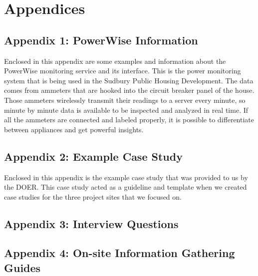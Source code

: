 \newpage
\chapter*{Appendices}

\section*{Appendix 1: PowerWise Information}
\par Enclosed in this appendix are some examples and information about the PowerWise monitoring service and its interface. This is the power monitoring system that is being used in the Sudbury Public Housing Development. The data comes from ammeters that are hooked into the circuit breaker panel of the house. Those ammeters wirelessly transmit their readings to a server every minute, so minute by minute data is available to be inspected and analyzed in real time. If all the ammeters are connected and labeled properly, it is possible to differentiate between appliances and get powerful insights.

\newpage
\addtocounter{page}{1}
\section*{Appendix 2: Example Case Study}
\par Enclosed in this appendix is the example case study that was provided to us by the DOER. This case study acted as a guideline and template when we created case studies for the three project sites that we focused on.

\newpage
\addtocounter{page}{2}
\section*{Appendix 3: Interview Questions}

\newpage
\addtocounter{page}{9}
\section*{Appendix 4: On-site Information Gathering Guides}

